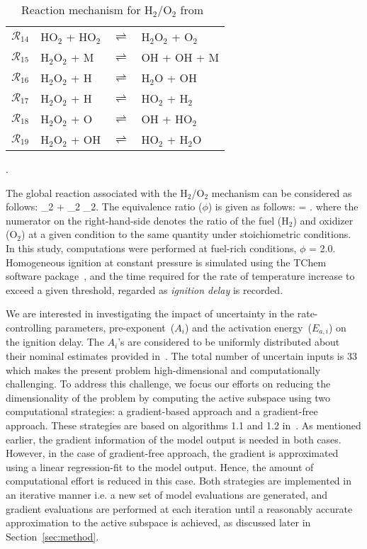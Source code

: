 \begin{table}[htbp]
\begin{center}
\begin{tabular}{llll}
$\mathcal{R}_{14}$ & HO$_2$ + HO$_2$ & $\rightleftharpoons$ & H$_2$O$_2$ + O$_2$ \\
$\mathcal{R}_{15}$ & H$_2$O$_2$ + M  & $\rightleftharpoons$ & OH + OH + M \\
$\mathcal{R}_{16}$ & H$_2$O$_2$ + H  & $\rightleftharpoons$ & H$_2$O + OH \\
$\mathcal{R}_{17}$ & H$_2$O$_2$ + H  & $\rightleftharpoons$ & HO$_2$ + H$_2$ \\
$\mathcal{R}_{18}$ & H$_2$O$_2$ + O  & $\rightleftharpoons$ & OH + HO$_2$ \\
$\mathcal{R}_{19}$ & H$_2$O$_2$ + OH & $\rightleftharpoons$ & HO$_2$ + H$_2$O \\
\bottomrule
\end{tabular}
\end{center}
\caption{Reaction mechanism for H$_2$/O$_2$ from~\cite{Yetter:1991}}.
\label{tab:kinetics}
\end{table}

The global reaction associated with the H$_2$/O$_2$ mechanism can
be considered as follows:
_2 + _2 _2.
\label{eq:global}
\ee 
The equivalence ratio ($\phi$) is given as follows:
%
\be
\phi = .
\label{eq:phi}
\ee
%
where the numerator on the right-hand-side denotes the ratio of the fuel (H$_2$)
and oxidizer (O$_2$) at a given condition to the same quantity under stoichiometric
conditions. In this study, computations were performed at fuel-rich conditions,
$\phi$ = 2.0. Homogeneous ignition at constant pressure is simulated using the
TChem software package~\cite{Safta:2011}, and the time required for the rate of
temperature increase to exceed a given threshold, regarded as \emph{ignition delay}
is recorded. 

We are interested in investigating the impact of uncertainty in the
rate-controlling parameters, pre-exponent~($A_i$) and the activation
energy~($E_{a,i}$) on the ignition delay. The $A_i$'s are considered to be
uniformly distributed about their nominal estimates provided
in~\cite{Yetter:1991}.  The total number of uncertain inputs is 33 which makes
the present problem high-dimensional and computationally challenging. 
To address this challenge, we focus our efforts on reducing the dimensionality
of the problem by computing the active subspace using
two computational strategies: a gradient-based approach and  
a gradient-free approach. These strategies are based on algorithms 1.1 and 1.2 
in~\cite{Constantine:2015}. As mentioned earlier, the gradient information of the model
output is needed in both cases. However, in the case of gradient-free approach,
the gradient is approximated using a linear regression-fit to the model output.
Hence, the amount of computational effort is reduced in this case. Both strategies
are implemented in an iterative manner i.e. a new set of model evaluations are
generated, and gradient evaluations are performed at each iteration until 
a reasonably accurate approximation to the active subspace is achieved, as
discussed later in Section~\ref{sec:method}. 


